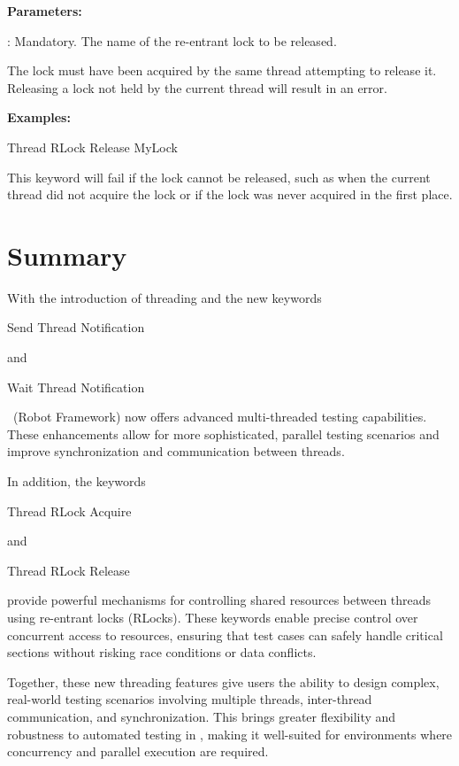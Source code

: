 \textbf{Parameters:}

: Mandatory. The name of the re-entrant lock to be released.

The lock must have been acquired by the same thread attempting to release it. Releasing a lock not held by the current thread will result in an error.

\textbf{Examples:}

\begin{robotcode}
Thread RLock Release    MyLock
\end{robotcode}

This keyword will fail if the lock cannot be released, such as when the current thread did not acquire the lock or if the lock was never acquired in the first place.


\section{Summary}

With the introduction of threading and the new keywords 
\begin{robotcode}
Send Thread Notification
\end{robotcode}
and 
\begin{robotcode}
Wait Thread Notification
\end{robotcode}
\rfw\ (Robot Framework) now offers advanced multi-threaded testing capabilities. These enhancements allow for more sophisticated, parallel testing scenarios and improve synchronization and communication between threads.

In addition, the keywords 
\begin{robotcode}
Thread RLock Acquire
\end{robotcode}
and 
\begin{robotcode}
Thread RLock Release
\end{robotcode}
provide powerful mechanisms for controlling shared resources between threads using re-entrant locks (RLocks). These keywords enable precise control over concurrent access to resources, ensuring that test cases can safely handle critical sections without risking race conditions or data conflicts.

Together, these new threading features give users the ability to design complex, real-world testing scenarios involving multiple threads, inter-thread communication, and synchronization. This brings greater flexibility and robustness to automated testing in \rfw, making it well-suited for environments where concurrency and parallel execution are required.

